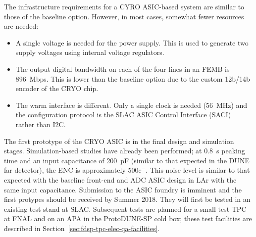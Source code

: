 The infrastructure requirements for a CYRO ASIC-based system are similar to those of the baseline option. However, in most cases, somewhat fewer resources are needed:
\begin{itemize}
\item{A single voltage is needed for the power supply. This is used to generate two supply voltages using internal voltage regulators.}
\item{The output digital bandwidth on each of the four lines in an FEMB is 896~Mbps. This is lower than the baseline option due to the custom 12b/14b encoder of the CRYO chip. }
\item{The warm interface is different. Only a single clock is needed (56~MHz) and the configuration protocol is the SLAC ASIC Control Interface (SACI)~\cite{SACI} rather than I2C.}
\end{itemize}

The first prototype of the CRYO ASIC is in the final design and simulation stages. Simulation-based studies have already been performed; at 0.8~\si{\micro}s peaking time and an input capacitance of 200~pF (similar to that expected in the DUNE far detector), the ENC is approximately 500e$^-$.  This noise level is similar to that expected with the baseline front-end and ADC ASIC design in LAr with the same input capacitance.  Submission to the ASIC foundry is imminent and the first protypes should be received by Summer 2018. They will first be tested in an existing test stand at SLAC. Subsequent tests are planned for a small test TPC at FNAL and on an APA in the ProtoDUNE-SP cold box; these test facilities are described in Section~\ref{sec:fdsp-tpc-elec-qa-facilities}.
